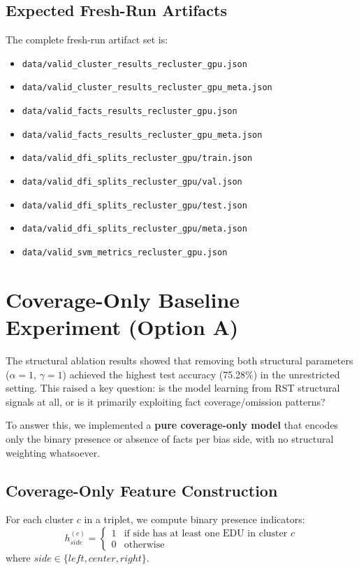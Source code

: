 \documentclass[12pt,a4paper]{article}
\begin{document}
\subsection{Expected Fresh-Run Artifacts}

The complete fresh-run artifact set is:
\begin{itemize}
\item \texttt{data/valid\_cluster\_results\_recluster\_gpu.json}
\item \texttt{data/valid\_cluster\_results\_recluster\_gpu\_meta.json}
\item \texttt{data/valid\_facts\_results\_recluster\_gpu.json}
\item \texttt{data/valid\_facts\_results\_recluster\_gpu\_meta.json}
\item \texttt{data/valid\_dfi\_splits\_recluster\_gpu/train.json}
\item \texttt{data/valid\_dfi\_splits\_recluster\_gpu/val.json}
\item \texttt{data/valid\_dfi\_splits\_recluster\_gpu/test.json}
\item \texttt{data/valid\_dfi\_splits\_recluster\_gpu/meta.json}
\item \texttt{data/valid\_svm\_metrics\_recluster\_gpu.json}
\end{itemize}

\section{Coverage-Only Baseline Experiment (Option A)}

The structural ablation results showed that removing both structural parameters ($\alpha=1$, $\gamma=1$)
achieved the highest test accuracy (75.28\%) in the unrestricted setting.
This raised a key question: is the model learning from RST structural signals at all,
or is it primarily exploiting fact coverage/omission patterns?

To answer this, we implemented a \textbf{pure coverage-only model} that encodes only the binary
presence or absence of facts per bias side, with no structural weighting whatsoever.

\subsection{Coverage-Only Feature Construction}

For each cluster $c$ in a triplet, we compute binary presence indicators:
\[
h^{(c)}_{side} = \begin{cases} 1 & \text{if side has at least one EDU in cluster } c \\ 0 & \text{otherwise} \end{cases}
\]
where $side \in \{left, center, right\}$.
\end{document}
